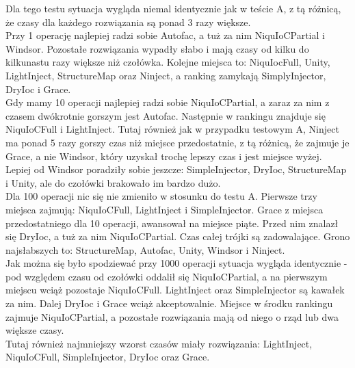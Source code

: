 \documentclass[12pt]{article}
\begin{document}
Dla tego testu sytuacja wygląda niemal identycznie jak w teście A, z tą różnicą, że czasy dla każdego rozwiązania są ponad 3 razy większe.\\
Przy 1 operację najlepiej radzi sobie Autofac, a tuż za nim NiquIoCPartial i Windsor. Pozostałe rozwiązania wypadły słabo i mają czasy od kilku do kilkunastu razy większe niż czołówka. Kolejne miejsca to: NiquIocFull, Unity, LightInject, StructureMap oraz Ninject, a ranking zamykają SimplyInjector, DryIoc i Grace.\\
Gdy mamy 10 operacji najlepiej radzi sobie NiquIoCPartial, a zaraz za nim z czasem dwókrotnie gorszym jest Autofac. Następnie w rankingu znajduje się NiquIoCFull i LightInject. Tutaj również jak w przypadku testowym A, Ninject ma ponad 5 razy gorszy czas niż miejsce przedostatnie, z tą różnicą, że zajmuje je Grace, a nie Windsor, który uzyskał trochę lepszy czas i jest miejsce wyżej. Lepiej od Windsor poradziły sobie jeszcze: SimpleInjector, DryIoc, StructureMap i Unity, ale do czołówki brakowało im bardzo dużo.\\
Dla 100 operacji nic się nie zmieniło w stosunku do testu A. Pierwsze trzy miejsca zajmują: NiquIoCFull, LightInject i SimpleInjector. Grace z miejsca przedostatniego dla 10 operacji, awansował na miejsce piąte. Przed nim znalazł się DryIoc, a tuż za nim NiquIoCPartial. Czas całej trójki są zadowalające. Grono najsłabszych to: StructureMap, Autofac, Unity, Windsor i Ninject.\\
Jak można się było spodziewać przy 1000 operacji sytuacja wygląda identycznie - pod względem czasu od czołówki oddalił się NiquIoCPartial, a na pierwszym miejscu wciąż pozostaje NiquIoCFull. LightInject oraz SimpleInjector są kawałek za nim. Dalej DryIoc i Grace wciąż akceptowalnie. Miejsce w środku rankingu zajmuje NiquIoCPartial, a pozostałe rozwiązania mają od niego o rząd lub dwa większe czasy.\\
Tutaj również najmniejszy wzorst czasów miały rozwiązania: LightInject, NiquIoCFull, SimpleInjector, DryIoc oraz Grace.
\end{document}
